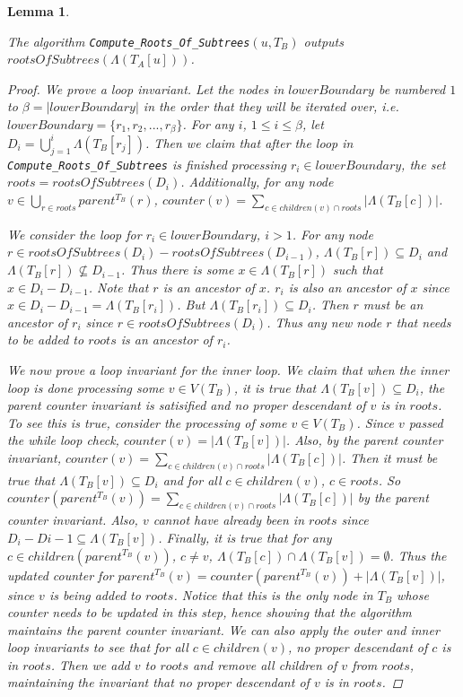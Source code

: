 \documentclass{article}
\newcommand{\leafset}{\Lambda}
\newtheorem{computerootsofsubtreescorrectness}[incompatibility]{Lemma}
\begin{document}
    \bigskip
    \begin{computerootsofsubtreescorrectness}
        \label{lem:computerootsofsubtreescorrectness}

        The algorithm \texttt{Compute\_Roots\_Of\_Subtrees}$(u, T_B)$ outputs $rootsOfSubtrees(\leafset(T_A[u]))$.

        \begin{proof}
            We prove a loop invariant. Let the nodes in $lowerBoundary$ be numbered $1$ to $\beta = |lowerBoundary|$ in the order that they will be iterated over, i.e. $lowerBoundary = \{r_1, r_2, ..., r_{\beta}\}$. For any $i$, $1 \leq i \leq \beta$, let $D_i = \bigcup_{j = 1}^{i} \leafset(T_B[r_j])$. Then we claim that after the loop in \texttt{Compute\_Roots\_Of\_Subtrees} is finished processing $r_i \in lowerBoundary$, the set $roots = rootsOfSubtrees(D_i)$. Additionally, for any node $v \in \bigcup_{r \in roots} parent^{T_B}(r)$, $counter(v) = \sum_{c \in children(v) \cap roots} |\leafset(T_B[c])|$.

            We consider the loop for $r_i \in lowerBoundary$, $i > 1$. For any node $r \in rootsOfSubtrees(D_i) - rootsOfSubtrees(D_{i-1})$, $\leafset(T_B[r]) \subseteq D_i$ and $\leafset(T_B[r]) \not\subseteq D_{i-1}$. Thus there is some $x \in \leafset(T_B[r])$ such that $x \in D_i - D_{i-1}$. Note that $r$ is an ancestor of $x$. $r_i$ is also an ancestor of $x$ since $x \in D_i - D_{i-1} = \leafset(T_B[r_i])$. But $\leafset(T_B[r_i]) \subseteq D_i$. Then $r$ must be an ancestor of $r_i$ since $r \in rootsOfSubtrees(D_i)$. Thus any new node $r$ that needs to be added to $roots$ is an ancestor of $r_i$.

            We now prove a loop invariant for the inner loop. We claim that when the inner loop is done processing some $v \in V(T_B)$, it is true that $\leafset(T_B[v]) \subseteq D_i$, the parent counter invariant is satisified and no proper descendant of $v$ is in $roots$. To see this is true, consider the processing of some $v \in V(T_B)$. Since $v$ passed the while loop check, $counter(v) = |\leafset(T_B[v])|$. Also, by the parent counter invariant, $counter(v) = \sum_{c \in children(v) \cap roots} |\leafset(T_B[c])|$. Then it must be true that $\leafset(T_B[v]) \subseteq D_i$ and for all $c \in children(v)$, $c \in roots$. So $counter(parent^{T_B}(v)) = \sum_{c \in children(v) \cap roots} |\leafset(T_B[c])|$ by the parent counter invariant. Also, $v$ cannot have already been in $roots$ since $D_i - D{i-1} \subseteq \leafset(T_B[v])$. Finally, it is true that for any $c \in children(parent^{T_B}(v))$, $c \neq v$, $\leafset(T_B[c]) \cap \leafset(T_B[v]) = \emptyset$. Thus the updated counter for $parent^{T_B}(v) = counter(parent^{T_B}(v)) + |\leafset(T_B[v])|$, since $v$ is being added to $roots$. Notice that this is the only node in $T_B$ whose counter needs to be updated in this step, hence showing that the algorithm maintains the parent counter invariant. We can also apply the outer and inner loop invariants to see that for all $c \in children(v)$, no proper descendant of $c$ is in $roots$. Then we add $v$ to $roots$ and remove all children of $v$ from $roots$, maintaining the invariant that no proper descendant of $v$ is in $roots$.


\end{proof}
\end{computerootsofsubtreescorrectness}
\end{document}
